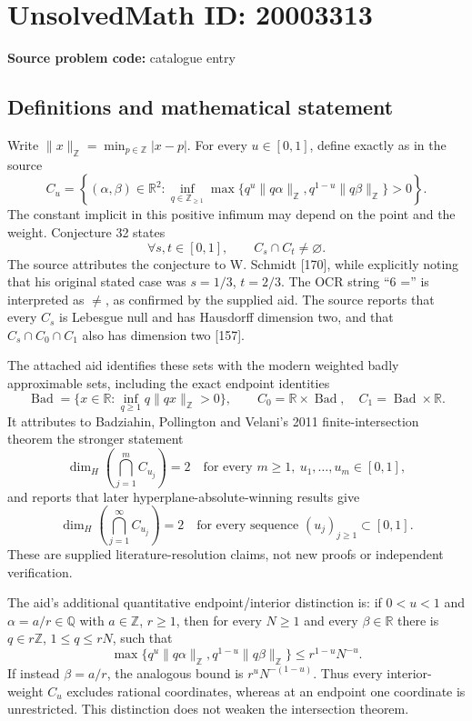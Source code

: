 \documentclass[11pt]{article}
\newcommand{\Z}{\mathbb{Z}}
\newcommand{\Q}{\mathbb{Q}}
\newcommand{\R}{\mathbb{R}}
\begin{document}
\section*{UnsolvedMath ID: 20003313}
\textbf{Source problem code:} catalogue entry
\subsection{Definitions and mathematical statement}
Write $\|x\|_{\Z}=\min_{p\in\Z}|x-p|$. For every $u\in[0,1]$, define exactly as in the source
\[
 C_u=\left\{(\alpha,\beta)\in\R^2:
 \inf_{q\in\Z_{\ge1}}\max\{q^u\|q\alpha\|_{\Z},
                         q^{1-u}\|q\beta\|_{\Z}\}>0\right\}.
\]
The constant implicit in this positive infimum may depend on the point and the weight. Conjecture 32 states
\[
 \forall s,t\in[0,1],\qquad C_s\cap C_t\ne\varnothing.
\]
The source attributes the conjecture to W. Schmidt [170], while explicitly noting that his original stated case was $s=1/3$, $t=2/3$. The OCR string ``6 ='' is interpreted as $\ne$, as confirmed by the supplied aid. The source reports that every $C_s$ is Lebesgue null and has Hausdorff dimension two, and that $C_s\cap C_0\cap C_1$ also has dimension two [157].

The attached aid identifies these sets with the modern weighted badly approximable sets, including the exact endpoint identities
\[
 \operatorname{Bad}=\{x\in\R:\inf_{q\ge1}q\|qx\|_{\Z}>0\},\qquad
 C_0=\R\times\operatorname{Bad},\quad C_1=\operatorname{Bad}\times\R.
\]
It attributes to Badziahin, Pollington and Velani's 2011 finite-intersection theorem the stronger statement
\[
 \dim_H\left(\bigcap_{j=1}^{m} C_{u_j}\right)=2
 \quad\text{for every }m\ge1,\ u_1,\ldots,u_m\in[0,1],
\]
and reports that later hyperplane-absolute-winning results give
\[
 \dim_H\left(\bigcap_{j=1}^{\infty} C_{u_j}\right)=2
 \quad\text{for every sequence }(u_j)_{j\ge1}\subset[0,1].
\]
These are supplied literature-resolution claims, not new proofs or independent verification.

The aid's additional quantitative endpoint/interior distinction is: if $0<u<1$ and $\alpha=a/r\in\Q$ with $a\in\Z$, $r\ge1$, then for every $N\ge1$ and every $\beta\in\R$ there is $q\in r\Z$, $1\le q\le rN$, such that
\[
 \max\{q^u\|q\alpha\|_{\Z},q^{1-u}\|q\beta\|_{\Z}\}
 \le r^{1-u}N^{-u}.
\]
If instead $\beta=a/r$, the analogous bound is $r^uN^{-(1-u)}$. Thus every interior-weight $C_u$ excludes rational coordinates, whereas at an endpoint one coordinate is unrestricted. This distinction does not weaken the intersection theorem.
\end{document}
